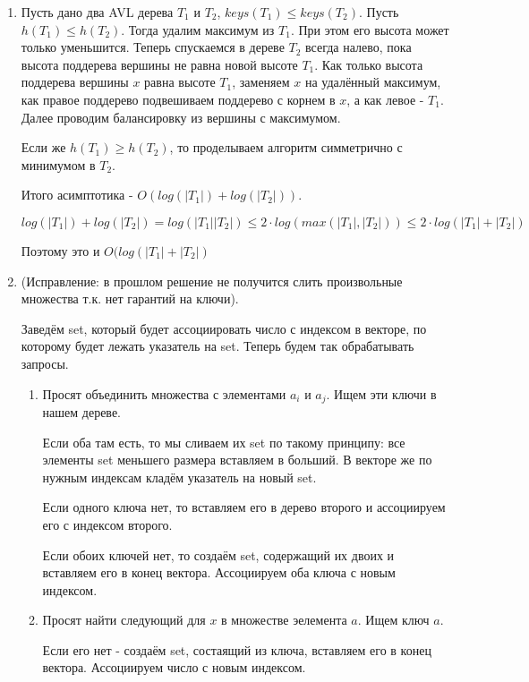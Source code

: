 \documentclass[a4paper,12pt]{article}
\begin{document}
\lstset{language=python}

\begin{enumerate}

\item Пусть дано два AVL дерева $T_1$ и $T_2$, $keys(T_1) \leq keys(T_2)$. Пусть $h(T_1) \leq h(T_2)$. Тогда удалим максимум из $T_1$. При этом его высота может только уменьшится. Теперь спускаемся в дереве $T_2$ всегда налево, пока высота поддерева вершины не равна новой высоте $T_1$. Как только высота поддерева вершины $x$ равна высоте $T_1$, заменяем $x$ на удалённый максимум, как правое поддерево подвешиваем поддерево с корнем в $x$, а как левое - $T_1$. Далее проводим балансировку из вершины с максимумом.

Если же $h(T_1) \geq h(T_2)$, то проделываем алгоритм симметрично с минимумом в $T_2$.

Итого асимптотика - $O(log(|T_1|) + log(|T_2|))$. 

$log(|T_1|) + log(|T_2|) = log(|T_1||T_2|) \leq 2 \cdot log(max(|T_1|, |T_2|)) \leq 2 \cdot log(|T_1| + |T_2|)$

Поэтому это и $O(log(|T_1| + |T_2|)$

\setcounter{enumi}{5}
\item (Исправление: в прошлом решение не получится слить произвольные множества т.к. нет гарантий на ключи). 

Заведём set, который будет ассоциировать число с индексом в векторе, по которому будет лежать указатель на set. Теперь будем так обрабатывать запросы.

\begin{enumerate}
\item Просят объединить множества с элементами $a_i$ и $a_j$. Ищем эти ключи в нашем дереве. 

Если оба там есть, то мы сливаем их set по такому принципу: все элементы set меньшего размера вставляем в больший. В векторе же по нужным индексам кладём указатель на новый set.

Если одного ключа нет, то вставляем его в дерево второго и ассоциируем его с индексом второго.

Если обоих ключей нет, то создаём set, содержащий их двоих и вставляем его в конец вектора. Ассоциируем оба ключа с новым индексом.

\item Просят найти следующий для $x$ в множестве эелемента $a$. Ищем ключ $a$. 

Если его нет - создаём set, состаящий из ключа, вставляем его в конец вектора. Ассоциируем число с новым индексом.


\end{enumerate}
\end{enumerate}
\end{document}
